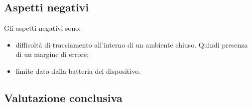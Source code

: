 \subsection{Aspetti negativi}
Gli aspetti negativi sono:
\begin{itemize}
	\item difficoltà di tracciamento all'interno di un ambiente chiuso. Quindi presenza di un margine di errore;
	\item limite dato dalla batteria del dispositivo.
	
\end{itemize}
\subsection{Valutazione conclusiva}
